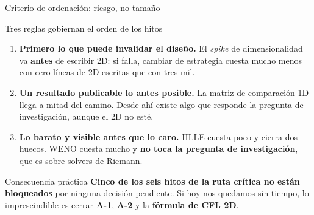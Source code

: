 \documentclass[aspectratio=169,10pt]{beamer}
\begin{document}
\begin{frame}[shrink]{Criterio de ordenación: riesgo, no tamaño}

  \begin{block}{Tres reglas gobiernan el orden de los hitos}
    \begin{enumerate}
      \item \textbf{Primero lo que puede invalidar el diseño.} El \emph{spike} de
            dimensionalidad va \textbf{antes} de escribir 2D: si falla, cambiar de
            estrategia cuesta mucho menos con cero líneas de 2D escritas que con
            tres mil.
      \item \textbf{Un resultado publicable lo antes posible.} La matriz de
            comparación 1D llega a mitad del camino. Desde ahí existe algo que
            responde la pregunta de investigación, aunque el 2D no esté.
      \item \textbf{Lo barato y visible antes que lo caro.} HLLE cuesta poco y
            cierra dos huecos. WENO cuesta mucho y \textbf{no toca la pregunta de
            investigación}, que es sobre solvers de Riemann.
    \end{enumerate}
  \end{block}

  \begin{exampleblock}{Consecuencia práctica}
    \small
    \textbf{Cinco de los seis hitos de la ruta crítica no están bloqueados} por
    ninguna decisión pendiente. Si hoy nos quedamos sin tiempo, lo imprescindible
    es cerrar \textbf{A-1}, \textbf{A-2} y la \textbf{fórmula de CFL 2D}.
  \end{exampleblock}
\end{frame}
\end{document}
